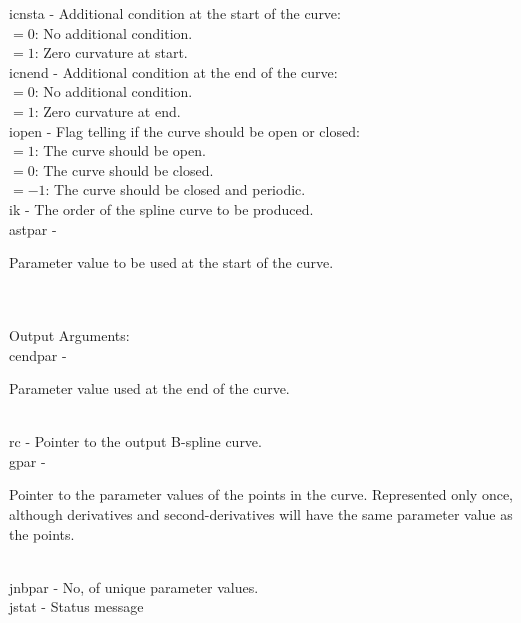         \>\>    {\fov icnsta}\> - \>
                Additional condition at the start of the curve:\\
                  \>\>\>\> $=0$\>: No additional condition.\\
                  \>\>\>\> $=1$\>: Zero curvature at start.\\
        \>\>    {\fov icnend}\> - \>
                Additional condition at the end of the curve:\\
                  \>\>\>\> $=0$\>: No additional condition.\\
                  \>\>\>\> $=1$\>: Zero curvature at end.\\
        \>\>    {\fov iopen}\> - \>
                Flag telling if the curve should be open or closed:\\
                  \>\>\>\> $=1$\>: The curve should be open.\\
                  \>\>\>\> $=0$\>: The curve should be closed.\\
                  \>\>\>\> $=-1$\>: The curve should be closed and periodic.\\
        \>\>    {\fov ik}\> - \> The order of the spline curve to be produced.\\
        \>\>    {\fov astpar}\> - \>
        \begin{minipg2}
          Parameter value to be used at the start of the curve.
        \end{minipg2}\\
\\
        \>Output Arguments:\\
        \>\>    {\fov cendpar}\> - \>
        \begin{minipg2}
          Parameter value used at the end of the curve.
        \end{minipg2}\\
        \>\>    {\fov rc}\> - \> Pointer to the output B-spline curve.\\
        \>\>    {\fov gpar}\> - \>
        \begin{minipg2}
          Pointer to the parameter values of the points in the
          curve. Represented only once, although derivatives and
          second-derivatives will have the same parameter value as the
          points.
        \end{minipg2}\\
        \>\>    {\fov jnbpar}\> - \>  No, of unique parameter values.\\
        \>\>    {\fov jstat}\> - \> Status message\\
